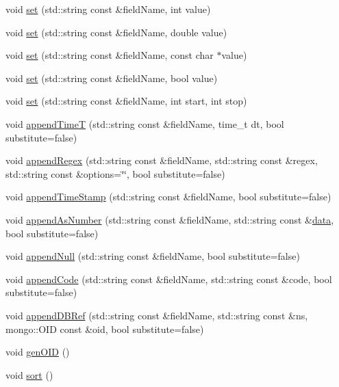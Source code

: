 \begin{DoxyCompactItemize}
\item 
void \hyperlink{classunisys_1_1DataObj_ae93e8390d583c6d3588fa8daf56e0b9e}{set} (std\-::string const \&field\-Name, int value)
\item 
void \hyperlink{classunisys_1_1DataObj_a8c21679bf7fb8575279ceb2f7a921976}{set} (std\-::string const \&field\-Name, double value)
\item 
void \hyperlink{classunisys_1_1DataObj_a3c4a277d0e90de7d13b88c7c14d0a99f}{set} (std\-::string const \&field\-Name, const char $\ast$value)
\item 
void \hyperlink{classunisys_1_1DataObj_a853d760d10b49243b7c83b1692d12dbc}{set} (std\-::string const \&field\-Name, bool value)
\item 
void \hyperlink{classunisys_1_1DataObj_a7c2d6a896ed5cdbf5c31aff3691a14a0}{set} (std\-::string const \&field\-Name, int start, int stop)
\item 
void \hyperlink{classunisys_1_1DataObj_a85ef5bce61421b55f16054dc0d8e3ccc}{append\-Time\-T} (std\-::string const \&field\-Name, time\-\_\-t dt, bool substitute=false)
\item 
void \hyperlink{classunisys_1_1DataObj_a66a85f06432cb3b5079bc4dc867ffd47}{append\-Regex} (std\-::string const \&field\-Name, std\-::string const \&regex, std\-::string const \&options=\char`\"{}\char`\"{}, bool substitute=false)
\item 
void \hyperlink{classunisys_1_1DataObj_aee9b67bba224472d199c0327306bffaa}{append\-Time\-Stamp} (std\-::string const \&field\-Name, bool substitute=false)
\item 
void \hyperlink{classunisys_1_1DataObj_a92854b00b01ce8ccdbc2e4b272d2977b}{append\-As\-Number} (std\-::string const \&field\-Name, std\-::string const \&\hyperlink{classunisys_1_1DataObj_a1c5410a047ff8cf88f810a6e3a1a7c29}{data}, bool substitute=false)
\item 
void \hyperlink{classunisys_1_1DataObj_a1ab8b5a73b228a328bbf032d13af43ab}{append\-Null} (std\-::string const \&field\-Name, bool substitute=false)
\item 
void \hyperlink{classunisys_1_1DataObj_a0c23d2edaffd7262391e58251d772f15}{append\-Code} (std\-::string const \&field\-Name, std\-::string const \&code, bool substitute=false)
\item 
void \hyperlink{classunisys_1_1DataObj_ab7582c0c47c4e2d8dbbe8bfcbe9b27c8}{append\-D\-B\-Ref} (std\-::string const \&field\-Name, std\-::string const \&ns, mongo\-::\-O\-I\-D const \&oid, bool substitute=false)
\item 
void \hyperlink{classunisys_1_1DataObj_a0e00b9d4961b2b11eba162a8d2636002}{gen\-O\-I\-D} ()
\item 
void \hyperlink{classunisys_1_1DataObj_aeeae93641245fa30a55aa07d24d44afd}{sort} ()
\end{DoxyCompactItemize}
